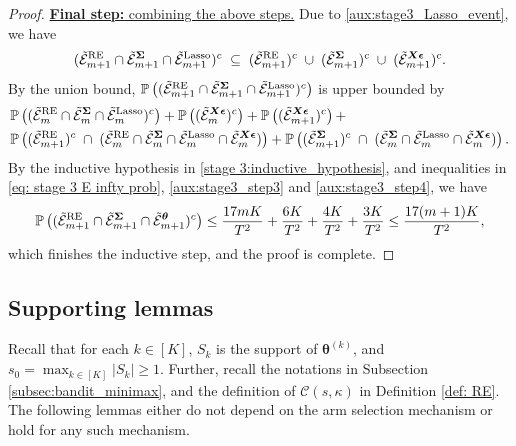 \documentclass[aos,preprint]{imsart}
\theoremstyle{plain}
\theoremstyle{definition}
\newcommand{\btheta}{\boldsymbol{\theta}}
\newcommand{\bd}[1]{\boldsymbol{#1}}
\newcommand{\bX}{\boldsymbol{X}}
\newcommand{\bSigma}{\boldsymbol{\Sigma}}
\newcommand{\mE}{\mathcal{E}}
\newcommand{\bepsilon}{\bd{\epsilon}}
\newcommand{\Pro}{\mathbb{P}}
\begin{document}
\begin{appendix}
\begin{proof}
\medskip
\noindent
\underline{\textbf{Final step:} combining the above steps.}
Due to \eqref{aux:stage3_Lasso_event}, we have
\begin{align*}
(\tilde{\mE}_{m+1}^{\textup{RE}}\cap\tilde{\mE}_{m+1}^{\bSigma}\cap \tilde{\mE}_{m+1}^{\textup{Lasso}})^c\;    \subseteq  \;(\tilde{\mE}_{m+1}^{\textup{RE}})^c\; \cup \; (\tilde{\mE}_{m+1}^{\bSigma})^c\; \cup\; (\tilde{\mE}_{m+1}^{\bX\bepsilon})^c.
\end{align*}
By the union bound, $\Pro\left((\tilde{\mE}_{m+1}^{\textup{RE}}\cap\tilde{\mE}_{m+1}^{\bSigma}\cap \tilde{\mE}_{m+1}^{\textup{Lasso}})^c\right)$ is upper bounded by
\begin{align*}
&    \Pro\left((\tilde{\mE}_{m}^{\textup{RE}}\cap\tilde{\mE}_{m}^{\bSigma}\cap \tilde{\mE}_{m}^{\textup{Lasso}})^c\right) + \Pro\left((\tilde{\mE}_{m}^{\bX\bepsilon})^c\right)+
    \Pro\left((\tilde{\mE}_{m+1}^{\bX\bepsilon})^c\right)+ \\
    & \Pro\left((\tilde{\mE}_{m+1}^{\textup{RE}})^c\; \cap \; (\tilde{\mE}_{m}^{\textup{RE}}\cap\tilde{\mE}_{m}^{\bSigma}\cap \tilde{\mE}_{m}^{\textup{Lasso}} \cap \tilde{\mE}_{m}^{\bX\bepsilon}) \right)
    +  \Pro\left((\tilde{\mE}_{m+1}^{\bSigma})^c\; \cap \; (\tilde{\mE}_{m}^{\bSigma}\cap \tilde{\mE}_{m}^{\textup{Lasso}}\cap \tilde{\mE}_{m}^{\bX\bepsilon}) \right).
\end{align*}
By the inductive hypothesis in \eqref{stage 3:inductive_hypothesis}, and inequalities in \eqref{eq: stage 3 E infty prob}, \eqref{aux:stage3_step3} and \eqref{aux:stage3_step4}, we have
\begin{align*}
\Pro\left((\tilde{\mE}_{m+1}^{\textup{RE}}\cap\tilde{\mE}_{m+1}^{\bSigma}\cap \tilde{\mE}_{m+1}^{\btheta})^c\right)
    \leq \frac{17mK}{T^2} +     \frac{6K}{T^2} + \frac{4K}{T^2} + \frac{3K}{T^2} \leq \frac{17(m+1)K}{T^2},
\end{align*}
which finishes the inductive step, and the proof is complete.
\end{proof}
 










\subsection{Supporting lemmas}
Recall that for each $k\in[K]$, $S_k$ is the support of $\btheta^{(k)}$, and $s_0 = \max_{k \in [K]} |S_k| \geq 1$. Further, recall the notations in Subsection \ref{subsec:bandit_minimax}, and the definition of $ \mathcal{C}(s, \kappa)$ in Definition \ref{def: RE}. 
The following lemmas either do not depend on the arm selection mechanism or hold for any such mechanism.



\end{appendix}
\end{document}
